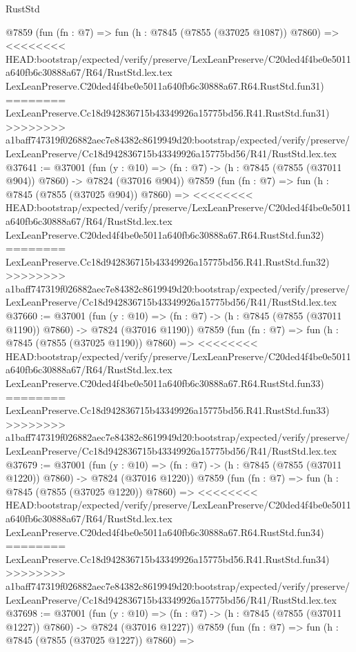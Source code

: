 \begin{lexlean}{RustStd}
\begin{coremodule}
{\begin{coremodule}
{{{{{{{{{{{{{{{{{{{{{{{{{{{{{{{{{{{{{{{{{{{{{{{{{{{{{{    @7859
    (fun (fn : @7) =>
    fun (h : @7845 (@7855 (@37025 @1087)) @7860) =>
<<<<<<<< HEAD:bootstrap/expected/verify/preserve/LexLeanPreserve/C20ded4f4be0e5011a640fb6c30888a67/R64/RustStd.lex.tex
    LexLeanPreserve.C20ded4f4be0e5011a640fb6c30888a67.R64.RustStd.fun31)
========
    LexLeanPreserve.Cc18d942836715b43349926a15775bd56.R41.RustStd.fun31)
>>>>>>>> a1baff747319f026882aec7e84382c8619949d20:bootstrap/expected/verify/preserve/LexLeanPreserve/Cc18d942836715b43349926a15775bd56/R41/RustStd.lex.tex
@37641 := @37001
    (fun (y : @10) => (fn : @7) -> (h : @7845 (@7855 (@37011 @904)) @7860) -> @7824 (@37016 @904))
    @7859
    (fun (fn : @7) =>
    fun (h : @7845 (@7855 (@37025 @904)) @7860) =>
<<<<<<<< HEAD:bootstrap/expected/verify/preserve/LexLeanPreserve/C20ded4f4be0e5011a640fb6c30888a67/R64/RustStd.lex.tex
    LexLeanPreserve.C20ded4f4be0e5011a640fb6c30888a67.R64.RustStd.fun32)
========
    LexLeanPreserve.Cc18d942836715b43349926a15775bd56.R41.RustStd.fun32)
>>>>>>>> a1baff747319f026882aec7e84382c8619949d20:bootstrap/expected/verify/preserve/LexLeanPreserve/Cc18d942836715b43349926a15775bd56/R41/RustStd.lex.tex
@37660 := @37001
    (fun (y : @10) => (fn : @7) -> (h : @7845 (@7855 (@37011 @1190)) @7860) -> @7824 (@37016 @1190))
    @7859
    (fun (fn : @7) =>
    fun (h : @7845 (@7855 (@37025 @1190)) @7860) =>
<<<<<<<< HEAD:bootstrap/expected/verify/preserve/LexLeanPreserve/C20ded4f4be0e5011a640fb6c30888a67/R64/RustStd.lex.tex
    LexLeanPreserve.C20ded4f4be0e5011a640fb6c30888a67.R64.RustStd.fun33)
========
    LexLeanPreserve.Cc18d942836715b43349926a15775bd56.R41.RustStd.fun33)
>>>>>>>> a1baff747319f026882aec7e84382c8619949d20:bootstrap/expected/verify/preserve/LexLeanPreserve/Cc18d942836715b43349926a15775bd56/R41/RustStd.lex.tex
@37679 := @37001
    (fun (y : @10) => (fn : @7) -> (h : @7845 (@7855 (@37011 @1220)) @7860) -> @7824 (@37016 @1220))
    @7859
    (fun (fn : @7) =>
    fun (h : @7845 (@7855 (@37025 @1220)) @7860) =>
<<<<<<<< HEAD:bootstrap/expected/verify/preserve/LexLeanPreserve/C20ded4f4be0e5011a640fb6c30888a67/R64/RustStd.lex.tex
    LexLeanPreserve.C20ded4f4be0e5011a640fb6c30888a67.R64.RustStd.fun34)
========
    LexLeanPreserve.Cc18d942836715b43349926a15775bd56.R41.RustStd.fun34)
>>>>>>>> a1baff747319f026882aec7e84382c8619949d20:bootstrap/expected/verify/preserve/LexLeanPreserve/Cc18d942836715b43349926a15775bd56/R41/RustStd.lex.tex
@37698 := @37001
    (fun (y : @10) => (fn : @7) -> (h : @7845 (@7855 (@37011 @1227)) @7860) -> @7824 (@37016 @1227))
    @7859
    (fun (fn : @7) =>
    fun (h : @7845 (@7855 (@37025 @1227)) @7860) =>
}}}}}}}}}}}}}}}}}}}}}}}}}}}}}}}}}}}}}}}}}}}}}}}}}}}}}}
\end{coremodule}}
\end{coremodule}
\end{lexlean}

